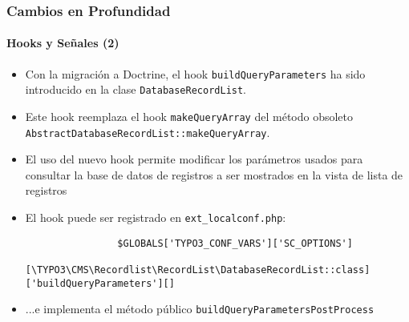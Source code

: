 \begin{frame}[fragile]
	\frametitle{Cambios en Profundidad}
	\framesubtitle{Hooks y Señales (2)}

	\lstset{basicstyle=\tiny\ttfamily}

	\begin{itemize}

		\item Con la migración a Doctrine, el hook \texttt{buildQueryParameters} ha sido introducido en la clase
			\texttt{DatabaseRecordList}.

		\item Este hook reemplaza el hook \texttt{makeQueryArray} del método obsoleto
			\texttt{AbstractDatabaseRecordList::makeQueryArray}.

		\item El uso del nuevo hook permite modificar los parámetros usados para consultar la base de datos de registros
			a ser mostrados en la vista de lista de registros

		\item El hook puede ser registrado en \texttt{ext\_localconf.php}:

			\begin{lstlisting}
				$GLOBALS['TYPO3_CONF_VARS']['SC_OPTIONS']
				  [\TYPO3\CMS\Recordlist\RecordList\DatabaseRecordList::class]['buildQueryParameters'][]
			\end{lstlisting}

		\item ...e implementa el método público \texttt{buildQueryParametersPostProcess}

	\end{itemize}

\end{frame}

